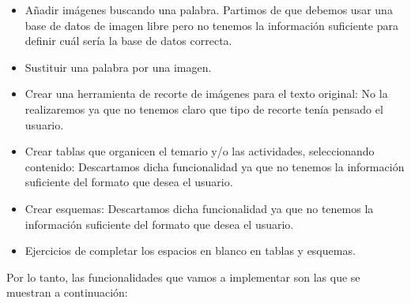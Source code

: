\begin{itemize}
  \item Añadir imágenes buscando una palabra. Partimos de que debemos usar una base de datos de imagen libre pero no tenemos la información suficiente para definir cuál sería la base de datos correcta.
  \item Sustituir una palabra por una imagen.
  \item Crear una herramienta de recorte de imágenes para el texto original: No la realizaremos ya que no tenemos claro que tipo de recorte tenía pensado el usuario. 
  \item Crear tablas que organicen el temario y/o las actividades, seleccionando contenido: Descartamos dicha funcionalidad ya que no tenemos la información suficiente del formato que desea el usuario.
  \item Crear esquemas: Descartamos dicha funcionalidad ya que no tenemos la información suficiente del formato que desea el usuario.
  \item Ejercicios de completar los espacios en blanco en tablas y esquemas.
\end{itemize}

Por lo tanto, las funcionalidades que vamos a implementar son las que se muestran a continuación:


